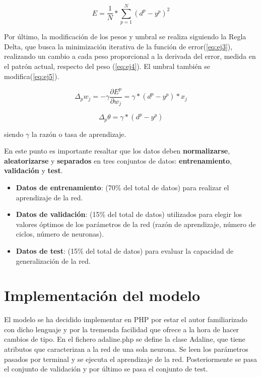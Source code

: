 \documentclass[11pt,spanish,listoffigures,listoftables]{workluis}
\begin{document}
\begin{equation}\label{eq:ej3}
E = \frac{1}{N}* \sum_{p=1}^{N}(d^{p} - y^{p})^{2}
\end{equation}

\par Por último, la modificación de los pesos y umbral se realiza siguiendo la Regla Delta, que busca la minimización iterativa de la función de error(\ref{eq:ej3}), realizando un cambio a cada peso proporcional a la derivada del error, medida en el patrón actual, respecto del peso (\ref{eq:ej4}). El umbral también se modifica(\ref{eq:ej5}).

\begin{equation}\label{eq:ej4}
\Delta_{p}w_{j} = -\gamma\frac{\partial E^{p}}{\partial w_{j}} = \gamma*(d^{p} - y^{p})*x_{j}
\end{equation} 

\begin{equation}\label{eq:ej5}
\Delta_{p}\theta = \gamma*(d^{p} - y^{p})
\end{equation}

\par siendo $\gamma$ la razón o tasa de aprendizaje.

\par En este punto es importante resaltar que los datos deben \textbf{normalizarse}, \textbf{aleatorizarse} y \textbf{separados} en tres conjuntos de datos: \textbf{entrenamiento}, \textbf{validación} y \textbf{test}.

\begin{itemize}
\item \textbf{Datos de entrenamiento}: (70\%  del  total  de  datos) para  realizar  el aprendizaje de la red. 
\item \textbf{Datos de validación}: (15\%  del  total  de  datos) utilizados para elegir los  valores  óptimos  de los parámetros  de  la  red  (razón  de aprendizaje, número de ciclos, número de neuronas).
\item \textbf{Datos de test}: (15\%  del  total  de  datos) para evaluar la capacidad de generalización de la red.
\end{itemize}

\section{Implementación del modelo}

\par El modelo se ha decidido implementar en PHP por estar el autor familiarizado con dicho lenguaje y por la tremenda facilidad que ofrece a la hora de hacer cambios de tipo. En el fichero adaline.php se define la clase Adaline, que tiene atributos que caracterizan a la red de una sola neurona. Se leen los parámetros pasados por terminal y se ejecuta el aprendizaje de la red. Posteriormente se pasa el conjunto de validación y por último se pasa el conjunto de test.
\end{document}
